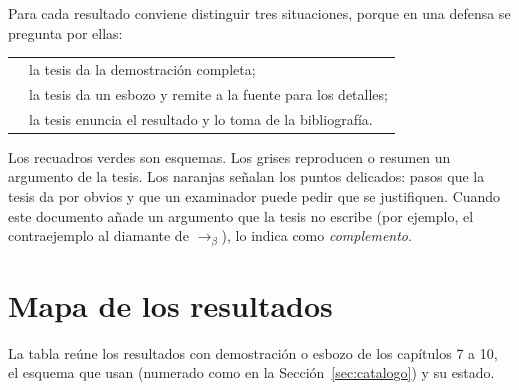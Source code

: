 \documentclass[11pt,a4paper]{article}
\newcommand{\etiqueta}[2]{\tcbox[on line, boxsep=0pt, left=3pt, right=3pt,
  top=1pt, bottom=1pt, colback=#1!12, colframe=#1, boxrule=0.4pt,
  arc=2pt]{\sffamily\scriptsize #2}}
\newcommand{\dem}{\etiqueta{okverde}{demostrado}}
\newcommand{\esb}{\etiqueta{esbozo}{esbozado}}
\newcommand{\cit}{\etiqueta{cita}{citado}}
\newcommand{\bred}{\rightarrow_\beta}
\begin{document}
Para cada resultado conviene distinguir tres situaciones, porque en una
defensa se pregunta por ellas:

\begin{center}
\begin{tabular}{@{}ll@{}}
\dem & la tesis da la demostración completa;\\[2pt]
\esb & la tesis da un esbozo y remite a la fuente para los detalles;\\[2pt]
\cit & la tesis enuncia el resultado y lo toma de la bibliografía.
\end{tabular}
\end{center}

\begin{nota}
Los recuadros verdes son esquemas. Los grises reproducen o resumen un
argumento de la tesis. Los naranjas señalan los puntos delicados: pasos que la
tesis da por obvios y que un examinador puede pedir que se justifiquen. Cuando
este documento añade un argumento que la tesis no escribe (por ejemplo, el
contraejemplo al diamante de \(\bred\)), lo indica como
\emph{complemento}.
\end{nota}

\section{Mapa de los resultados}

La tabla reúne los resultados con demostración o esbozo de los capítulos 7
a 10, el esquema que usan (numerado como en la Sección~\ref{sec:catalogo}) y
su estado.
\end{document}
